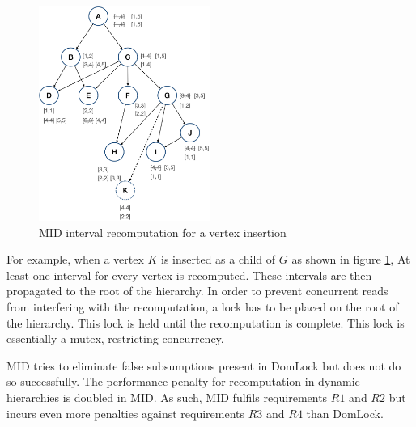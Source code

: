 \begin{figure}[H]
    \centering
    \captionsetup{justification=centering}
    \includegraphics[width=0.5\textwidth]{figures/MID_example_with_SM.png}
    \caption{MID interval recomputation for a vertex insertion}
    \label{fig:MID_example_SM}
\end{figure}

For example, when a vertex $K$ is inserted as a child of $G$ as shown in figure \ref{fig:MID_example_SM}, At least one interval for every vertex is recomputed. These intervals are then propagated to the root of the hierarchy. In order to prevent concurrent reads from interfering with the recomputation, a lock has to be placed on the root of the hierarchy. This lock is held until the recomputation is complete. This lock is essentially a mutex, restricting concurrency.

MID tries to eliminate false subsumptions present in DomLock but does not do so successfully. The performance penalty for recomputation in dynamic hierarchies is doubled in MID. As such, MID fulfils requirements $R1$ and $R2$ but incurs even more penalties against requirements $R3$ and $R4$ than DomLock.

